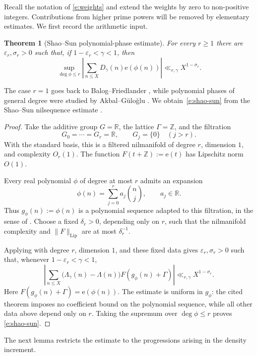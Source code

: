 \documentclass[12pt]{amsart}
\newcommand{\1}{\mathbf 1}
\newcommand{\e}{\mathrm e}
\newtheorem{theorem}{Theorem}[section]
\begin{document}
Recall the notation of \eqref{e:weights} and extend the weights
by zero to non-positive integers. Contributions from higher prime
powers will be removed by elementary estimates.
We first record the arithmetic input. 

\begin{theorem}[Shao--Sun polynomial-phase estimate]
\label{t:shao-sun}
For every $r\geq1$ there are $\varepsilon_r,\sigma_r>0$ such that, if
$1-\varepsilon_r<\gamma<1$, then
\begin{equation}\label{e:shao-sun}
 \sup_{\deg\phi\leq r}
 \left|\sum_{n\leq X}D_\gamma(n)\e(\phi(n))\right|
 \ll_{r,\gamma}X^{1-\sigma_r}.
\end{equation}
\end{theorem}

The case $r=1$ goes back to Balog--Friedlander
\cite{BalogFriedlander}, while polynomial phases of general
degree were studied by Akbal--G\"ulo\u{g}lu
\cite{AkbalGuloglu}.
We obtain~\eqref{e:shao-sun} from the Shao--Sun nilsequence
estimate \cite[Theorem~2.1]{ShaoSun}.

\begin{proof}
Take the additive group $G=\mathbb R$, the lattice $\Gamma=\mathbb Z$,
and the filtration
\[
 G_0=\cdots=G_r=\mathbb R,\qquad G_j=\{0\}\quad(j>r).
\]
With the standard basis, this is a filtered nilmanifold of degree $r$,
dimension $1$, and complexity $O_r(1).$ The function
$F(t+\mathbb Z):=\e(t)$ has Lipschitz norm $O(1)$.

Every real polynomial $\phi$ of degree at most $r$ admits an expansion
\[
 \phi(n)=\sum_{j=0}^{r}a_j\binom nj,\qquad a_j\in\mathbb R.
\]
Thus $g_\phi(n):=\phi(n)$ is a polynomial sequence adapted to this
filtration, in the sense of \cite[Definition~4.5]{ShaoSun}.
Choose a fixed $\delta_r>0$, depending only on $r$, such that the
nilmanifold complexity and $\|F\|_{\mathrm{Lip}}$ are at most
$\delta_r^{-1}$.

Applying \cite[Theorem~2.1]{ShaoSun} with degree $r$, dimension $1$,
and these fixed data gives $\varepsilon_r,\sigma_r>0$ such that,
whenever $1-\varepsilon_r<\gamma<1$,
\[
 \left|\sum_{n\leq X}
 \bigl(\Lambda_\gamma(n)-\Lambda(n)\bigr)
 F(g_\phi(n)+\Gamma)\right|
 \ll_{r,\gamma}X^{1-\sigma_r}.
\]
Here $F(g_\phi(n)+\Gamma)=\e(\phi(n))$. The estimate is uniform in
$g_\phi$: the cited theorem imposes no coefficient bound on the
polynomial sequence, while all other data above depend only on $r$.
Taking the supremum over $\deg\phi\leq r$ proves
\eqref{e:shao-sun}.
\end{proof}
The next lemma restricts the estimate to the progressions arising in the
density increment.
\end{document}
